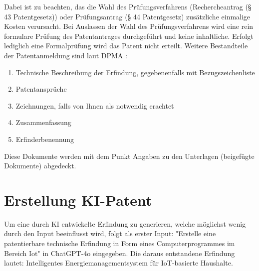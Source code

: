Dabei ist zu beachten, das die Wahl des Prüfungsverfahrens 
(Rechercheantrag (§ 43 Patentgesetz)) oder
Prüfungsantrag (§ 44 Patentgesetz) zusätzliche einmalige Kosten verursacht.
Bei Auslassen der Wahl des Prüfungsverfahrens wird eine rein formulare
Prüfung des Patentantrages durchgeführt und keine inhaltliche.
Erfolgt lediglich eine Formalprüfung wird das Patent nicht erteilt.
Weitere Bestandteile der Patentanmeldung sind laut DPMA \cite{DPMAAnmeldung}:

\begin{enumerate}
	\item Technische Beschreibung der Erfindung, gegebenenfalls mit Bezugszeichenliste
	\item Patentansprüche
	\item Zeichnungen, falls von Ihnen als notwendig erachtet
	\item Zusammenfassung
	\item Erfinderbenennung
\end{enumerate}

Diese Dokumente werden mit dem Punkt Angaben 
zu den Unterlagen (beigefügte Dokumente) abgedeckt.

\section{Erstellung KI-Patent}

Um eine durch KI entwickelte Erfindung zu generieren, 
welche möglichst wenig durch den Input beeinflusst wird, 
folgt als erster Input:
"Erstelle eine patentierbare technische Erfindung 
in Form eines Computerprogrammes im Bereich Iot" 
in ChatGPT-4o eingegeben.
Die daraus entstandene Erfindung lautet:
Intelligentes Energiemanagementsystem für \gls{IoT}-basierte Haushalte.

